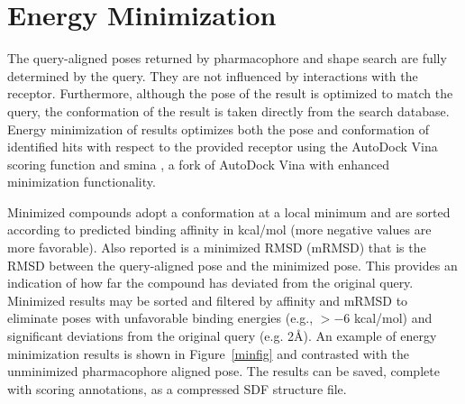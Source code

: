 \section{Energy Minimization}

The query-aligned poses returned by pharmacophore and shape search are fully determined by the query. They are not influenced by interactions with the receptor.  Furthermore, although the pose of the result is optimized to match the query, the conformation of the result is taken directly from the search database.  Energy minimization of results optimizes both the pose and conformation of identified hits with respect to the provided receptor using the AutoDock Vina \cite{Trott_2009} scoring function and smina \cite{smina}, a fork of AutoDock Vina with enhanced minimization functionality. 

Minimized compounds adopt a conformation at a local minimum and are sorted according to predicted binding affinity in kcal/mol (more negative values are more favorable).  Also reported is a minimized RMSD (mRMSD) that is the RMSD between the query-aligned pose and the minimized pose.  This provides an indication of how far the compound has deviated from the original query.  Minimized results may be sorted and filtered by affinity and mRMSD to eliminate poses with unfavorable binding energies (e.g., $>-6$ kcal/mol) and significant deviations from the original query (e.g. 2{\AA}). An example of energy minimization results is shown in Figure~\ref{minfig} and contrasted with the unminimized pharmacophore aligned pose. The results can be saved, complete with scoring annotations, as a compressed SDF structure file.